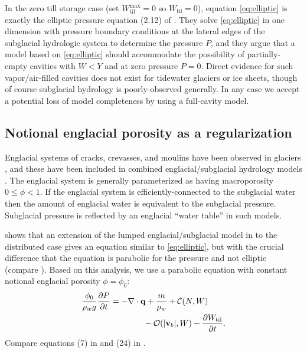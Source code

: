 \documentclass[gmd]{copernicus}   %
\newcommand{\text}{\textrm}
\newcommand\bv{\mathbf{v}}
\newcommand\bq{\mathbf{q}}
\newcommand{\ddt}[1]{\ensuremath{\frac{\partial #1}{\partial t}}}
\newcommand{\Div}{\nabla\cdot}
\newcommand{\Wtil}{W_{\text{til}}}
\newcommand{\Wtilmax}{W_{\text{til}}^{\text{max}}}
\begin{document}
In the zero till storage case (set $\Wtilmax=0$ so $\Wtil=0$), equation \eqref{eq:elliptic} is exactly the elliptic pressure equation (2.12) of \cite{Schoofetal2012}.  They solve \eqref{eq:elliptic} in one dimension with pressure boundary conditions at the lateral edges of the subglacial hydrologic system to determine the pressure $P$, and they argue that a model based on \eqref{eq:elliptic} should accommodate the possibility of partially-empty cavities with $W<Y$ and at zero pressure $P=0$.  Direct evidence for such vapor/air-filled cavities does not exist for tidewater glaciers or ice sheets, though of course subglacial hydrology is poorly-observed generally.  In any case we accept a potential loss of model completeness by using a full-cavity model.

\subsection{Notional englacial porosity as a regularization}  Englacial systems of cracks, crevasses, and moulins have been observed in glaciers \citep[for example]{Fountainetal2005,Bartholomausetal2008,Harperetal2010}, and these have been included in combined englacial/subglacial hydrology models \citep{FlowersClarke2002_theory,Bartholomausetal2011,Hewitt2013,Werderetal2013}.  The englacial system is generally parameterized as having macroporosity $0\le \phi < 1$.  If the englacial system is efficiently-connected to the subglacial water then the amount of englacial water is equivalent to the subglacial pressure.  Subglacial pressure is reflected by an englacial ``water table'' in such models.

\cite{Bueler2014correspondence} shows that an extension of the lumped englacial/subglacial model in \cite{Bartholomausetal2011} to the distributed case gives an equation similar to \eqref{eq:elliptic}, but with the crucial difference that the equation is parabolic for the pressure and not elliptic (compare \cite{Hewittetal2012}).  Based on this analysis, we use a parabolic equation with constant notional englacial porosity $\phi=\phi_0$:
\begin{align}
\frac{\phi_0}{\rho_w g} \ddt{P} &= - \Div \bq + \frac{m}{\rho_w} + \mathcal{C}(N,W)  \label{eq:regpressureequation} \\
  &\qquad\qquad - \mathcal{O}(|\bv_b|,W) - \ddt{\Wtil}. \notag
\end{align}
Compare equations (7) in \cite{Hewitt2013} and (24) in \cite{Werderetal2013}.
\end{document}
